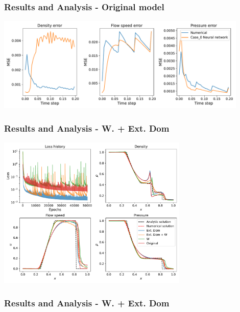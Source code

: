 \documentclass[aspectratio=169]{beamer}
\begin{document}
\begin{frame}\frametitle{Results and Analysis - Original model}
	
	\begin{center}
		\includegraphics[width=0.9\textwidth]{Figures/Figure_3.pdf}
	\end{center}	
\end{frame}


\begin{frame}\frametitle{Results and Analysis - W. + Ext. Dom}
	
	\begin{center}
		\includegraphics[width=0.68\textwidth]{Figures/Figure_5.pdf}
	\end{center}	
\end{frame}


\begin{frame}\frametitle{Results and Analysis -  W. + Ext. Dom}
		
	\begin{center}
		 \\
	\end{center}

\end{frame}
\end{document}

